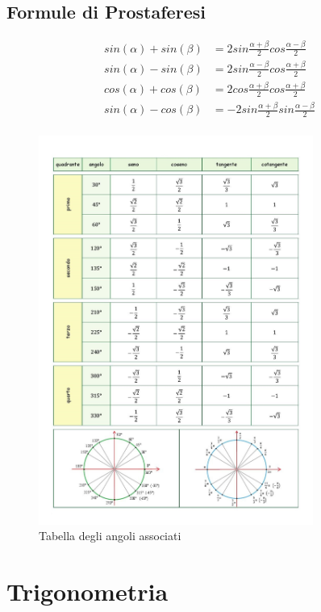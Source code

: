 \documentclass[a4paper]{article}
\begin{document}
	\subsection{Formule di Prostaferesi}
	\begin{align*}
	sin(\alpha) + sin(\beta) &= 2 sin{\frac{\alpha + \beta}{2}}cos{\frac{\alpha - \beta}{2}}\\
	sin(\alpha) - sin(\beta) &= 2 sin{\frac{\alpha - \beta}{2}}cos{\frac{\alpha + \beta}{2}}\\
	cos(\alpha) + cos(\beta) &= 2 cos{\frac{\alpha + \beta}{2}}cos{\frac{\alpha + \beta}{2}}\\
	sin(\alpha) - cos(\beta) &= -2 sin{\frac{\alpha + \beta}{2}}sin{\frac{\alpha - \beta}{2}}\\
	\end{align*}
	
	
	\begin{center}
		\begin{figure}[htpb]
			\includegraphics[width=9cm]{img/sincos.jpg}
			\caption{Tabella degli angoli associati}
		\end{figure}
	\end{center}
	
	
	\newpage
	\section{Trigonometria}
\end{document}
